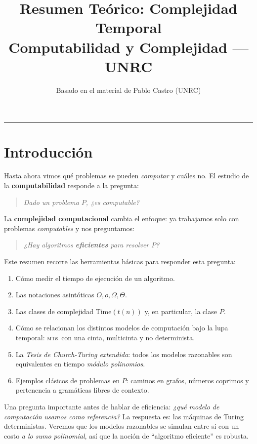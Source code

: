 \documentclass[11pt,a4paper]{article}
\title{\textbf{Resumen Teórico: Complejidad Temporal}\\[0.3em]
\large Computabilidad y Complejidad --- UNRC}
\author{Basado en el material de Pablo Castro (UNRC)}
\date{}
\theoremstyle{definicion}
\newcommand{\MTs}{\textsc{mt}s}
\begin{document}
\maketitle

\tableofcontents

\vspace{1em}
\hrule
\vspace{1em}

\section{Introducción}

Hasta ahora vimos qué problemas se pueden \emph{computar} y cuáles no. El estudio de la \textbf{computabilidad} responde a la pregunta:
\begin{quote}
\emph{Dado un problema $P$, ¿es computable?}
\end{quote}

La \textbf{complejidad computacional} cambia el enfoque: ya trabajamos solo con problemas \emph{computables} y nos preguntamos:
\begin{quote}
\emph{¿Hay algoritmos \textbf{eficientes} para resolver $P$?}
\end{quote}

Este resumen recorre las herramientas básicas para responder esta pregunta:
\begin{enumerate}
    \item Cómo medir el tiempo de ejecución de un algoritmo.
    \item Las notaciones asintóticas $O, o, \Omega, \Theta$.
    \item Las clases de complejidad $\mathrm{Time}(t(n))$ y, en particular, la clase $P$.
    \item Cómo se relacionan los distintos modelos de computación bajo la lupa temporal: \MTs\ con una cinta, multicinta y no determinista.
    \item La \emph{Tesis de Church-Turing extendida}: todos los modelos razonables son equivalentes en tiempo \emph{módulo polinomios}.
    \item Ejemplos clásicos de problemas en $P$: caminos en grafos, números coprimos y pertenencia a gramáticas libres de contexto.
\end{enumerate}

\begin{intuicion}
Una pregunta importante antes de hablar de eficiencia: \emph{¿qué modelo de computación usamos como referencia?} La respuesta es: las máquinas de Turing deterministas. Veremos que los modelos razonables se simulan entre sí con un costo \emph{a lo sumo polinomial}, así que la noción de ``algoritmo eficiente'' es robusta.
\end{intuicion}
\end{document}
